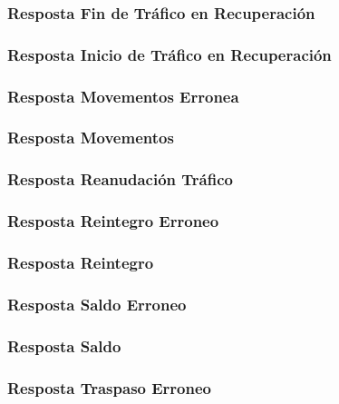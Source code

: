 \documentclass[a4paper,titlepage]{article}
\begin{document}
\subsubsection{Resposta Fin de Tráfico en Recuperación}

\subsubsection{Resposta Inicio de Tráfico en Recuperación}

\subsubsection{Resposta Movementos Erronea}

\subsubsection{Resposta Movementos}

\subsubsection{Resposta Reanudación Tráfico}

\subsubsection{Resposta Reintegro Erroneo}

\subsubsection{Resposta Reintegro}

\subsubsection{Resposta Saldo Erroneo}

\subsubsection{Resposta Saldo}

\subsubsection{Resposta Traspaso Erroneo}

\end{document}
